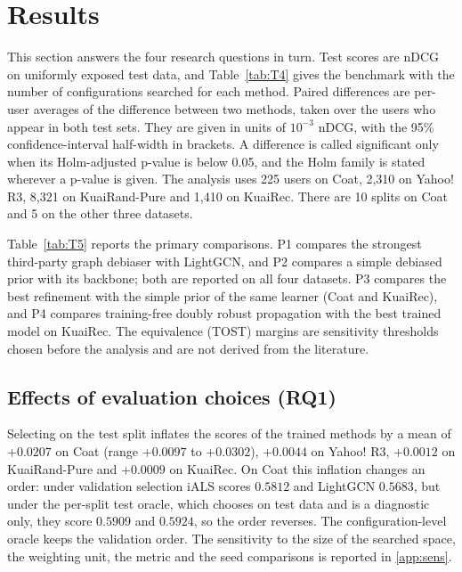 \section{Results}\label{sec:results}

This section answers the four research questions in turn. Test scores are nDCG on uniformly exposed test data, and
Table~\ref{tab:T4} gives the benchmark with the number of configurations searched for each method. Paired differences
are per-user averages of the difference between two methods, taken over the users who appear in both test sets. They
are given in units of $10^{-3}$ nDCG, with the 95\% confidence-interval half-width in brackets. A difference is called
significant only when its Holm-adjusted p-value is below 0.05, and the Holm family is stated wherever a p-value is
given. The analysis uses 225 users on Coat, 2,310 on Yahoo! R3, 8,321 on KuaiRand-Pure and 1,410 on KuaiRec. There
are 10 splits on Coat and 5 on the other three datasets.



Table~\ref{tab:T5} reports the primary comparisons. P1 compares the strongest third-party graph debiaser with LightGCN,
and P2 compares a simple debiased prior with its backbone; both are reported on all four datasets. P3 compares the best
refinement with the simple prior of the same learner (Coat and KuaiRec), and P4 compares training-free doubly robust
propagation with the best trained model on KuaiRec. The equivalence (TOST) margins are sensitivity thresholds chosen
before the analysis and are not derived from the literature.



\subsection{Effects of evaluation choices (RQ1)}\label{sec:res-eval}

Selecting on the test split inflates the scores of the trained methods by a mean of $+0.0207$ on Coat (range $+0.0097$
to $+0.0302$), $+0.0044$ on Yahoo! R3, $+0.0012$ on KuaiRand-Pure and $+0.0009$ on KuaiRec. On Coat this inflation
changes an order: under validation selection iALS scores $0.5812$ and LightGCN $0.5683$, but under the per-split test
oracle, which chooses on test data and is a diagnostic only, they score $0.5909$ and $0.5924$, so the order reverses.
The configuration-level oracle keeps the validation order. The sensitivity to the size of the searched space, the
weighting unit, the metric and the seed comparisons is reported in \ref{app:sens}.

